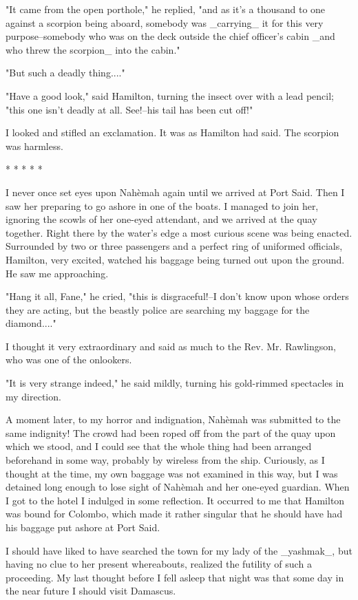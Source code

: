 "It came from the open porthole," he replied, "and as it's a thousand
to one against a scorpion being aboard, somebody was _carrying_ it for
this very purpose--somebody who was on the deck outside the chief
officer's cabin _and who threw the scorpion_ into the cabin."

"But such a deadly thing...."

"Have a good look," said Hamilton, turning the insect over with a
lead pencil; "this one isn't deadly at all. See!--his tail has been
cut off!"

I looked and stifled an exclamation. It was as Hamilton had said. The
scorpion was harmless.

       *       *       *       *       *

I never once set eyes upon Nahèmah again until we arrived at Port
Said. Then I saw her preparing to go ashore in one of the boats. I
managed to join her, ignoring the scowls of her one-eyed attendant,
and we arrived at the quay together. Right there by the water's edge
a most curious scene was being enacted. Surrounded by two or three
passengers and a perfect ring of uniformed officials, Hamilton, very
excited, watched his baggage being turned out upon the ground. He saw
me approaching.

"Hang it all, Fane," he cried, "this is disgraceful!--I don't know
upon whose orders they are acting, but the beastly police are
searching my baggage for the diamond...."

I thought it very extraordinary and said as much to the Rev. Mr.
Rawlingson, who was one of the onlookers.

"It is very strange indeed," he said mildly, turning his gold-rimmed
spectacles in my direction.

A moment later, to my horror and indignation, Nahèmah was submitted to
the same indignity! The crowd had been roped off from the part of the
quay upon which we stood, and I could see that the whole thing had
been arranged beforehand in some way, probably by wireless from the
ship. Curiously, as I thought at the time, my own baggage was not
examined in this way, but I was detained long enough to lose sight of
Nahèmah and her one-eyed guardian. When I got to the hotel I indulged
in some reflection. It occurred to me that Hamilton was bound for
Colombo, which made it rather singular that he should have had his
baggage put ashore at Port Said.

I should have liked to have searched the town for my lady of the
_yashmak_, but having no clue to her present whereabouts, realized
the futility of such a proceeding. My last thought before I fell
asleep that night was that some day in the near future I should
visit Damascus.


